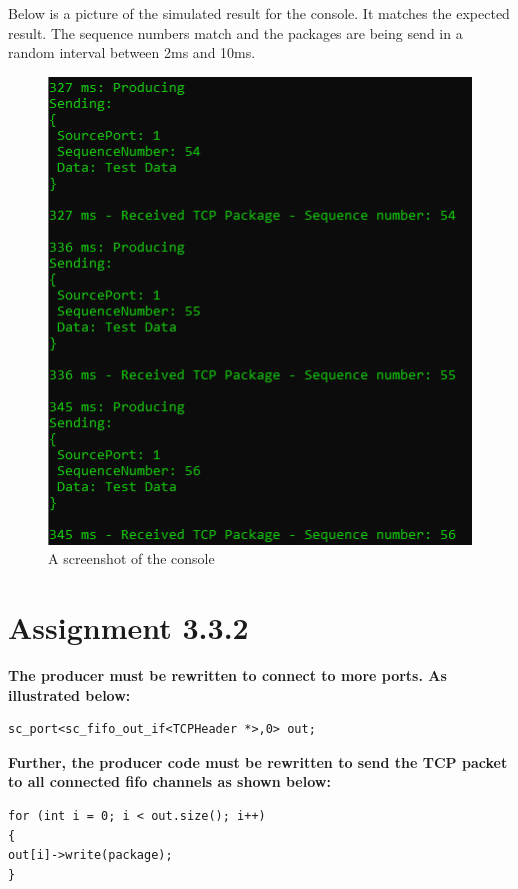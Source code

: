 Below is a picture of the simulated result for the console. 
It matches the expected result. The sequence numbers match and the packages are being send in a random interval between 2ms and 10ms. 


\begin{figure}[H]
	\centering
	\includegraphics[width=\textwidth]{Images/ConsoleWindow3_3.png}
	\caption{A screenshot of the console}
	\label{fig:ConsoleWindow_3_3}
\end{figure}


\section{Assignment 3.3.2}

\textbf{The producer must be rewritten to connect to more ports. As illustrated below:}
	
\begin{lstlisting}
sc_port<sc_fifo_out_if<TCPHeader *>,0> out;
\end{lstlisting}
	
\textbf{Further, the producer code must be rewritten to send the TCP packet to all connected fifo channels as
shown below:}

\begin{lstlisting}	
for (int i = 0; i < out.size(); i++)
{
out[i]->write(package);
}
\end{lstlisting}

